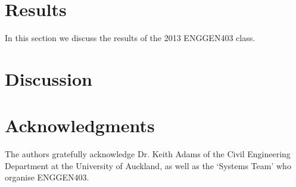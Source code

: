 \documentclass[12pt]{ORSNZ}
\begin{document}
\section{Results}
	In this section we discuss the results of the 2013 ENGGEN403 class.
	
\section{Discussion}


\section*{Acknowledgments}
The authors gratefully acknowledge Dr. Keith Adams of the Civil Engineering Department at the University of Auckland, as well as the `Systems Team' who organise ENGGEN403.



\end{document}
